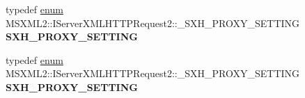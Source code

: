 \begin{DoxyCompactItemize}
\item 
\mbox{\label{interface_m_s_x_m_l2_1_1_i_server_x_m_l_h_t_t_p_request2_a0b93602ed90431b36175e8233499c1cb}} 
typedef \hyperlink{interfaceenum}{enum} M\+S\+X\+M\+L2\+::\+I\+Server\+X\+M\+L\+H\+T\+T\+P\+Request2\+::\+\_\+\+S\+X\+H\+\_\+\+P\+R\+O\+X\+Y\+\_\+\+S\+E\+T\+T\+I\+NG {\bfseries S\+X\+H\+\_\+\+P\+R\+O\+X\+Y\+\_\+\+S\+E\+T\+T\+I\+NG}
\item 
\mbox{\label{interface_m_s_x_m_l2_1_1_i_server_x_m_l_h_t_t_p_request2_a0b93602ed90431b36175e8233499c1cb}} 
typedef \hyperlink{interfaceenum}{enum} M\+S\+X\+M\+L2\+::\+I\+Server\+X\+M\+L\+H\+T\+T\+P\+Request2\+::\+\_\+\+S\+X\+H\+\_\+\+P\+R\+O\+X\+Y\+\_\+\+S\+E\+T\+T\+I\+NG {\bfseries S\+X\+H\+\_\+\+P\+R\+O\+X\+Y\+\_\+\+S\+E\+T\+T\+I\+NG}
\end{DoxyCompactItemize}
